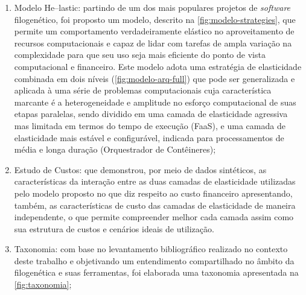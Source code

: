 \documentclass[english,brazilian]{UNISINOSmonografia} %
\begin{document}
\begin{enumerate}[label={\arabic*)}]
	
	
	\item Modelo \textsf{He}--lastic: partindo de um dos mais populares projetos de \textit{software} filogenético, foi proposto um modelo, descrito na \autoref{fig:modelo-strategies}, que permite um comportamento verdadeiramente elástico no aproveitamento de recursos computacionais e capaz de lidar com tarefas de ampla variação na complexidade para que seu uso seja mais eficiente do ponto de vista computacional e financeiro.
	Este modelo adota uma estratégia de elasticidade combinada em dois níveis (\autoref{fig:modelo-arq-full}) que pode ser generalizada e aplicada à uma série de problemas computacionais cuja característica marcante é a heterogeneidade e amplitude no esforço computacional de suas etapas paralelas, sendo dividido em uma camada de elasticidade agressiva mas limitada em termos do tempo de execução (FaaS), e uma camada de elasticidade mais estável e configurável, indicada para processamentos de média e longa duração (Orquestrador de Contêineres);
	
	
	
	
	\item Estudo de Custos: que demonstrou, por meio de dados sintéticos, as características da interação entre as duas camadas de elasticidade utilizadas pelo modelo proposto no que diz respeito ao custo financeiro apresentando, também, as características de custo das camadas de elasticidade de maneira independente, o que permite compreender melhor cada camada assim como sua estrutura de custos e cenários ideais de utilização.
	
	\item Taxonomia: com base no levantamento bibliográfico realizado no contexto deste trabalho e objetivando um entendimento compartilhado no âmbito da filogenética e suas ferramentas, foi elaborada uma taxonomia apresentada na \autoref{fig:taxonomia};
	
	

\end{enumerate}
\end{document}
